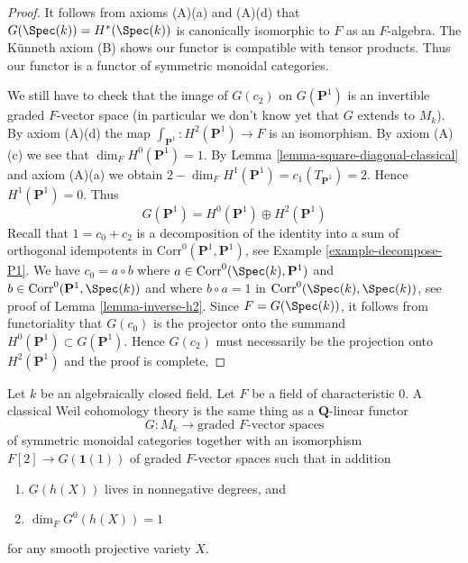 \begin{proof}
\medskip\noindent
It follows from axioms (A)(a) and (A)(d) that
$G(\Spec(k)) = H^*(\Spec(k))$ is canonically isomorphic to $F$
as an $F$-algebra.
The K\"unneth axiom (B) shows our functor is compatible with tensor products.
Thus our functor is a functor of symmetric monoidal categories.

\medskip\noindent
We still have to check that the image of $G(c_2)$ on $G(\mathbf{P}^1)$
is an invertible graded $F$-vector space (in particular we don't know yet
that $G$ extends to $M_k$).
By axiom (A)(d) the map $\int_{\mathbf{P}^1} : H^2(\mathbf{P}^1) \to F$
is an isomorphism. By axiom (A)(c) we see that $\dim_F H^0(\mathbf{P}^1) = 1$.
By Lemma \ref{lemma-square-diagonal-classical} and axiom (A)(a)
we obtain $2 - \dim_F H^1(\mathbf{P}^1) = c_1(T_{\mathbf{P}^1}) = 2$.
Hence $H^1(\mathbf{P}^1) = 0$. Thus
$$
G(\mathbf{P}^1) = H^0(\mathbf{P}^1) \oplus H^2(\mathbf{P}^1)
$$
Recall that $1 = c_0 + c_2$ is a decomposition of the identity
into a sum of orthogonal idempotents in
$\text{Corr}^0(\mathbf{P}^1, \mathbf{P}^1)$, see
Example \ref{example-decompose-P1}. We have $c_0 = a \circ b$ where
$a \in \text{Corr}^0(\Spec(k), \mathbf{P}^1)$ and
$b \in \text{Corr}^0(\mathbf{P}^1, \Spec(k))$ and where
$b \circ a = 1$ in $\text{Corr}^0(\Spec(k), \Spec(k))$, see proof of
Lemma \ref{lemma-inverse-h2}. Since $F = G(\Spec(k))$, it follows from
functoriality that $G(c_0)$ is the projector onto the summand
$H^0(\mathbf{P}^1) \subset G(\mathbf{P}^1)$. Hence
$G(c_2)$ must necessarily be the projection onto $H^2(\mathbf{P}^1)$
and the proof is complete.
\end{proof}

\begin{proposition}
\label{proposition-weil-cohomology-theory-classical}
Let $k$ be an algebraically closed field. Let $F$ be a field of
characteristic $0$. A classical Weil cohomology theory is the same thing
as a $\mathbf{Q}$-linear functor
$$
G : M_k \longrightarrow \text{graded }F\text{-vector spaces}
$$
of symmetric monoidal categories together with an isomorphism
$F[2] \to G(\mathbf{1}(1))$ of graded $F$-vector spaces such that
in addition
\begin{enumerate}
\item $G(h(X))$ lives in nonnegative degrees, and
\item $\dim_F G^0(h(X)) = 1$
\end{enumerate}
for any smooth projective variety $X$.
\end{proposition}

